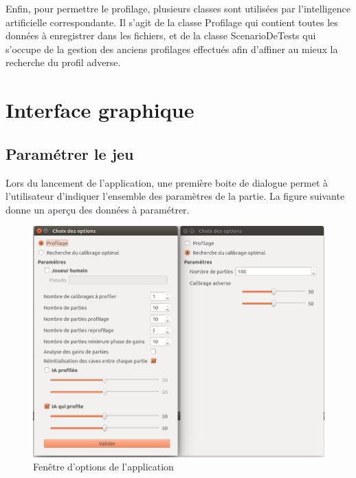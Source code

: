 \documentclass{report}
\begin{document}
Enfin, pour permettre le profilage, plusieurs classes sont utilisées par l'intelligence artificielle correspondante. Il s'agit de la classe Profilage qui contient toutes les données à enregistrer dans les fichiers, et de la classe ScenarioDeTests qui s'occupe de la gestion des anciens profilages effectués afin d'affiner au mieux la recherche du profil adverse.\\

\section{Interface graphique}

\subsection{Paramétrer le jeu}

\hspace{0.5cm}Lors du lancement de l'application, une première boite de dialogue permet à l'utilisateur d'indiquer l'ensemble des paramètres de la partie. La figure suivante donne un aperçu des données à paramétrer.

\begin{figure}[H]
	\begin{center}
		\includegraphics[scale=0.3]{./imagesRapport/interfaceGraphiqueFenetreOptions.png}
	\end{center}
	\caption[Fenêtre d'options de l'application]{Fenêtre d'options de l'application}
\end{figure}
\end{document}
